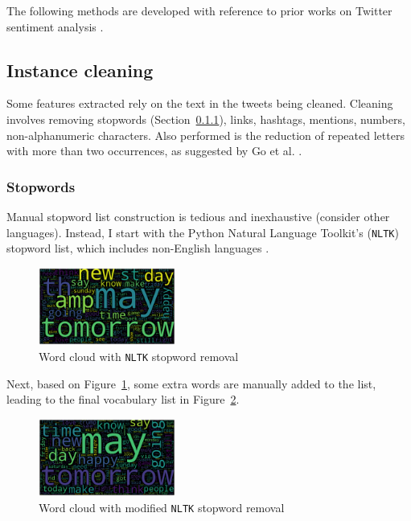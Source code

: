 \documentclass[11pt]{article}
\begin{document}
The following methods are developed with reference to prior works on {T}witter sentiment analysis \cite{go09,nltk,robustnoisy10}.

\subsection{Instance cleaning}

Some features extracted rely on the text in the tweets being cleaned.
Cleaning involves removing stopwords (Section~\ref{sec:stopwords}), links, hashtags, mentions, numbers, non-alphanumeric characters.
Also performed is the reduction of repeated letters with more than two occurrences, as suggested by Go et al. .

\subsubsection{Stopwords}\label{sec:stopwords}

Manual stopword list construction is tedious and inexhaustive (consider other languages). 
Instead, I start with the {P}ython Natural Language Toolkit's (\texttt{NLTK}) stopword list, which includes non-English languages \cite{nltk}.

\begin{figure}[H]
	\centering
	\includegraphics[width = 0.4\textwidth]{wc/all-clean-nltk.png}
	\caption{Word cloud with \texttt{NLTK} stopword removal}
	\label{fig:wc-nltk}
\end{figure}

Next, based on Figure~\ref{fig:wc-nltk}, some extra words are manually added to the list, leading to the final vocabulary list in Figure~\ref{fig:wc-final}.

\begin{figure}[H]
	\centering
	\includegraphics[width = 0.4\textwidth]{wc/all-clean-final.png}
	\caption{Word cloud with modified \texttt{NLTK} stopword removal}
	\label{fig:wc-final}
\end{figure} 
\end{document}
